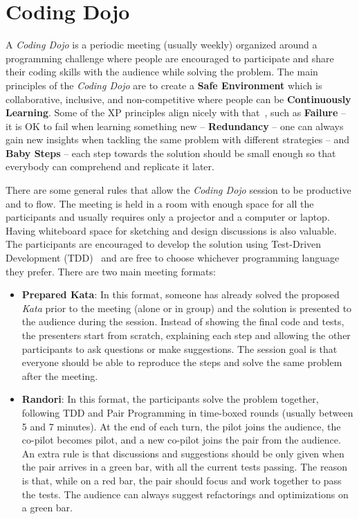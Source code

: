\section{Coding Dojo}\label{sec:dojo}

A \emph{Coding Dojo} is a periodic meeting (usually weekly) organized
around a programming challenge where people are encouraged to
participate and share their coding skills with the audience while
solving the problem. The main principles of the \emph{Coding Dojo} are
to create a \textbf{Safe Environment} which is collaborative,
inclusive, and non-competitive where people can be
\textbf{Continuously Learning}. Some of the XP principles align nicely
with that~\cite{XP2E}, such as \textbf{Failure} -- it is OK to fail
when learning something new -- \textbf{Redundancy} -- one can always
gain new insights when tackling the same problem with different
strategies -- and \textbf{Baby Steps} -- each step towards the
solution should be small enough so that everybody can comprehend and
replicate it later.

There are some general rules that allow the \emph{Coding Dojo} session
to be productive and to flow.  The meeting is held in a room with
enough space for all the participants and usually requires only a
projector and a computer or laptop. Having whiteboard space for
sketching and design discussions is also valuable. The participants
are encouraged to develop the solution using Test-Driven Development
(TDD)~\cite{TDD} and are free to choose whichever programming language
they prefer. There are two main meeting formats:

\begin{itemize}
\item \textbf{Prepared Kata}: In this format, someone has already
  solved the proposed \emph{Kata} prior to the meeting (alone or in
  group) and the solution is presented to the audience during the
  session.  Instead of showing the final code and tests, the
  presenters start from scratch, explaining each step and allowing the
  other participants to ask questions or make suggestions. The session
  goal is that everyone should be able to reproduce the steps and
  solve the same problem after the meeting.
	
\item \textbf{Randori}: In this format, the participants solve the
  problem together, following TDD and Pair Programming in time-boxed
  rounds (usually between 5 and 7 minutes). At the end of each turn,
  the pilot joins the audience, the co-pilot becomes pilot, and a new
  co-pilot joins the pair from the audience. An extra rule is that
  discussions and suggestions should be only given when the pair
  arrives in a green bar, with all the current tests passing. The
  reason is that, while on a red bar, the pair should focus and work
  together to pass the tests. The audience can always suggest
  refactorings and optimizations on a green bar.
\end{itemize}

